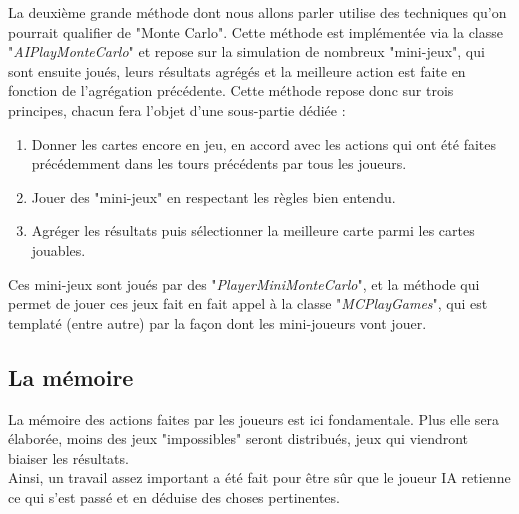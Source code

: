 \documentclass[a4paper,11pt]{article}
\begin{document}
La deuxième grande méthode dont nous allons parler utilise des techniques qu'on pourrait qualifier de "Monte Carlo". Cette méthode est implémentée via la classe "\textit{AIPlayMonteCarlo}" et repose sur la simulation de nombreux "mini-jeux", qui sont ensuite joués, leurs résultats agrégés et la meilleure action est faite en fonction de l'agrégation précédente. Cette méthode repose donc sur trois principes, chacun fera l'objet d'une sous-partie dédiée :
\begin{enumerate}
\item Donner les cartes encore en jeu, en accord avec les actions qui ont été faites précédemment dans les tours précédents par tous les joueurs.
\item Jouer des "mini-jeux" en respectant les règles bien entendu.
\item Agréger les résultats puis sélectionner la meilleure carte parmi les cartes jouables. \\
\end{enumerate}
Ces mini-jeux sont joués par des "\textit{PlayerMiniMonteCarlo}", et la méthode qui permet de jouer ces jeux fait en fait appel à la classe "\textit{MCPlayGames}", qui est templaté (entre autre) par la façon dont les mini-joueurs vont jouer.


\subsection{La mémoire}
La mémoire des actions faites par les joueurs est ici fondamentale. Plus elle sera élaborée, moins des jeux "impossibles" seront distribués, jeux qui viendront biaiser les résultats. \\

Ainsi, un travail assez important a été fait pour être sûr que le joueur IA retienne ce qui s'est passé et en déduise des choses pertinentes. \\
\end{document}
